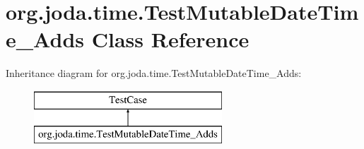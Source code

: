 \hypertarget{classorg_1_1joda_1_1time_1_1_test_mutable_date_time___adds}{\section{org.\-joda.\-time.\-Test\-Mutable\-Date\-Time\-\_\-\-Adds Class Reference}
\label{classorg_1_1joda_1_1time_1_1_test_mutable_date_time___adds}
}
Inheritance diagram for org.\-joda.\-time.\-Test\-Mutable\-Date\-Time\-\_\-\-Adds\-:\begin{figure}[H]
\begin{center}
\leavevmode
\includegraphics[height=2.000000cm]{classorg_1_1joda_1_1time_1_1_test_mutable_date_time___adds}
\end{center}
\end{figure}
